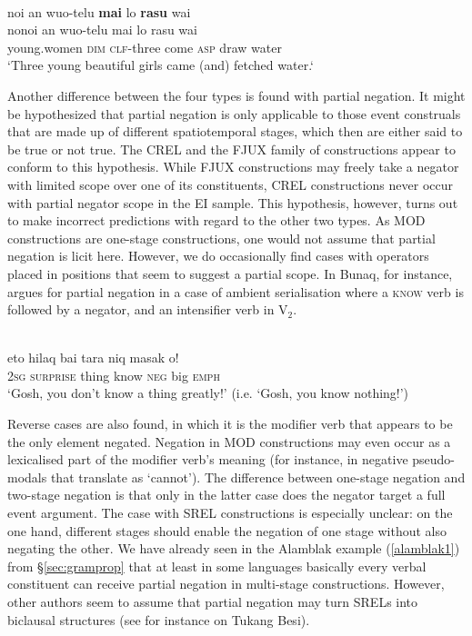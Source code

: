 \ea \label{WMH_Julio_goat099_new}
\\
\glll noi an wuo-telu \textbf{mai} lo \textbf{rasu} wai \\
nonoi an wuo-telu mai lo rasu wai \\
young.women \textsc{dim} \textsc{clf}-three come \textsc{asp} draw water\\
\glft `Three young beautiful girls came (and) fetched water.`\\ 
\z

Another difference between the four types is found with partial negation. It might be hypothesized that partial negation is only applicable to those event construals that are made up of different spatiotemporal stages, which then are either said to be true or not true. The CREL and the FJUX family of constructions appear to conform to this hypothesis. While FJUX constructions may freely take a negator with limited scope over one of its constituents, CREL constructions never occur with partial negator scope in the EI sample. This hypothesis, however, turns out to make incorrect predictions with regard to the other two types. As MOD constructions are one-stage constructions, one would not assume that partial negation is licit here. However, we do occasionally find cases with operators placed in positions that seem to suggest a partial scope. In Bunaq, for instance, \citet[451]{schapper2009bunaq} argues for partial negation in a case of ambient serialisation where a \textsc{know} verb is followed by a negator, and an intensifier verb in V$_2$.

\ea 
{}\\
\gll eto hilaq bai tara niq masak o! \\
2\textsc{sg} \textsc{surprise} thing know \textsc{neg} big \textsc{emph} \\
\glft `Gosh, you don’t know a thing greatly!' (i.e. `Gosh, you know nothing!')\\ 
\z

Reverse cases are also found, in which it is the modifier verb that appears to be the only element negated. Negation in MOD constructions may even occur as a lexicalised part of the modifier verb's meaning (for instance, in negative pseudo-modals that translate as `cannot'). The difference between one-stage negation and two-stage negation is that only in the latter case does the negator target a full event argument. The case with SREL constructions is especially unclear: on the one hand, different stages should enable the negation of one stage without also negating the other. We have already seen in the Alamblak example (\ref{alamblak1}) from §\ref{sec:gramprop} that at least in some languages basically every verbal constituent can receive partial negation in multi-stage constructions. However, other authors seem to assume that partial negation may turn SRELs into biclausal structures (see for instance \citealt[184]{donohue1999} on Tukang Besi). 

